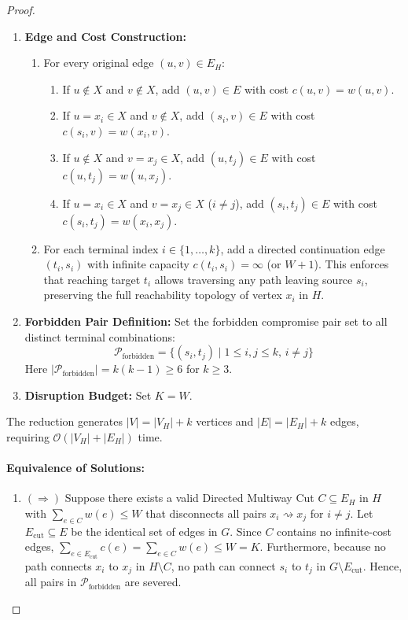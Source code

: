 \begin{proof}
\begin{enumerate}
    \item \textbf{Edge and Cost Construction:}
    \begin{enumerate}
        \item For every original edge $(u, v) \in E_H$:
        \begin{enumerate}
            \item If $u \notin X$ and $v \notin X$, add $(u, v) \in E$ with cost $c(u, v) = w(u, v)$.
            \item If $u = x_i \in X$ and $v \notin X$, add $(s_i, v) \in E$ with cost $c(s_i, v) = w(x_i, v)$.
            \item If $u \notin X$ and $v = x_j \in X$, add $(u, t_j) \in E$ with cost $c(u, t_j) = w(u, x_j)$.
            \item If $u = x_i \in X$ and $v = x_j \in X$ ($i \neq j$), add $(s_i, t_j) \in E$ with cost $c(s_i, t_j) = w(x_i, x_j)$.
        \end{enumerate}
        \item For each terminal index $i \in \{1, \dots, k\}$, add a directed continuation edge $(t_i, s_i)$ with infinite capacity $c(t_i, s_i) = \infty$ (or $W + 1$). This enforces that reaching target $t_i$ allows traversing any path leaving source $s_i$, preserving the full reachability topology of vertex $x_i$ in $H$.
    \end{enumerate}

    \item \textbf{Forbidden Pair Definition:} Set the forbidden compromise pair set to all distinct terminal combinations:
    \begin{equation}
    \mathcal{P}_{\text{forbidden}} = \{(s_i, t_j) \mid 1 \le i, j \le k, \, i \neq j\}
    \end{equation}
    Here $|\mathcal{P}_{\text{forbidden}}| = k(k-1) \ge 6$ for $k \ge 3$.

    \item \textbf{Disruption Budget:} Set $K = W$.
\end{enumerate}

The reduction generates $|V| = |V_H| + k$ vertices and $|E| = |E_H| + k$ edges, requiring $\mathcal{O}(|V_H| + |E_H|)$ time.

\paragraph{Equivalence of Solutions:}
\begin{enumerate}
    \item $(\Rightarrow)$ Suppose there exists a valid Directed Multiway Cut $C \subseteq E_H$ in $H$ with $\sum_{e \in C} w(e) \le W$ that disconnects all pairs $x_i \rightsquigarrow x_j$ for $i \neq j$. Let $E_{\text{cut}} \subseteq E$ be the identical set of edges in $G$. Since $C$ contains no infinite-cost edges, $\sum_{e \in E_{\text{cut}}} c(e) = \sum_{e \in C} w(e) \le W = K$. Furthermore, because no path connects $x_i$ to $x_j$ in $H \setminus C$, no path can connect $s_i$ to $t_j$ in $G \setminus E_{\text{cut}}$. Hence, all pairs in $\mathcal{P}_{\text{forbidden}}$ are severed.


\end{enumerate}
\end{proof}
